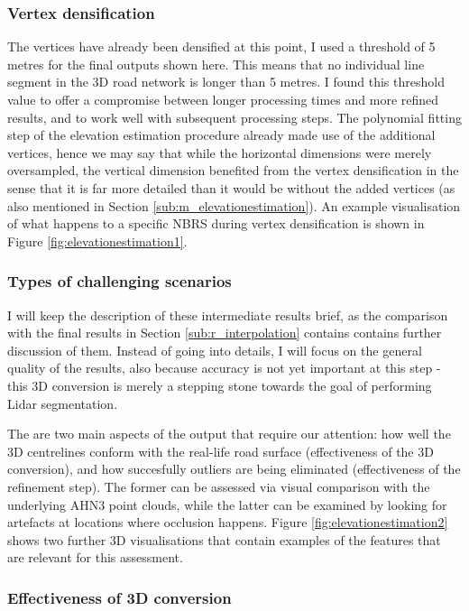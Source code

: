 \subsubsection{Vertex densification}

The vertices have already been densified at this point, I used a threshold of 5 metres for the final outputs shown here. This means that no individual line segment in the 3D road network is longer than 5 metres. I found this threshold value to offer a compromise between longer processing times and more refined results, and to work well with subsequent processing steps. The polynomial fitting step of the elevation estimation procedure already made use of the additional vertices, hence we may say that while the horizontal dimensions were merely oversampled, the vertical dimension benefited from the vertex densification in the sense that it is far more detailed than it would be without the added vertices (as also mentioned in Section \ref{sub:m_elevationestimation}). An example visualisation of what happens to a specific NBRS during vertex densification is shown in Figure \ref{fig:elevationestimation1}.

\subsubsection{Types of challenging scenarios}

I will keep the description of these intermediate results brief, as the comparison with the final results in Section \ref{sub:r_interpolation} contains contains further discussion of them. Instead of going into details, I will focus on the general quality of the results, also because accuracy is not yet important at this step - this 3D conversion is merely a stepping stone towards the goal of performing Lidar segmentation.

The are two main aspects of the output that require our attention: how well the 3D centrelines conform with the real-life road surface (effectiveness of the 3D conversion), and how succesfully outliers are being eliminated (effectiveness of the refinement step). The former can be assessed via visual comparison with the underlying AHN3 point clouds, while the latter can be examined by looking for artefacts at locations where occlusion happens. Figure \ref{fig:elevationestimation2} shows two further 3D visualisations that contain examples of the features that are relevant for this assessment.

\subsubsection{Effectiveness of 3D conversion}

